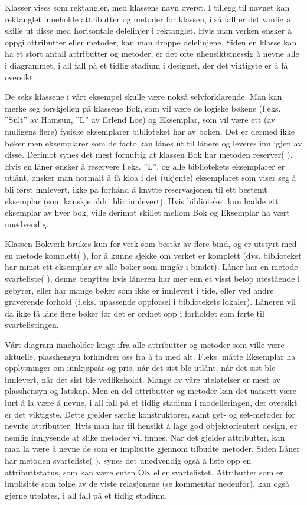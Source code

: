 Klasser vises som rektangler, med klassens navn øverst. I tillegg til navnet kan rektanglet inneholde attributter og metoder for klassen, i så fall er det vanlig å skille ut disse med horisontale delelinjer i rektanglet. Hvis man verken ønsker å oppgi attributter eller metoder, kan man droppe delelinjene. Siden en klasse kan ha et stort antall attributter og metoder, er det ofte uhensiktsmessig å nevne alle i diagrammet, i all fall på et tidlig stadium i designet, der det viktigste er å få oversikt.

De seks klassene i vårt eksempel skulle være nokså selvforklarende. Man kan merke seg forskjellen på klassene Bok, som vil være de logiske bøkene (f.eks. ”Sult” av Hamsun, ”L” av Erlend Loe) og Eksemplar, som vil være ett (av muligens flere) fysiske eksemplarer biblioteket har av boken. Det er dermed ikke bøker men eksemplarer som de facto kan lånes ut til lånere og leveres inn igjen av disse. Derimot synes det mest fornuftig at klassen Bok har metoden reserver( ). Hvis en låner ønsker å reservere f.eks. ”L”, og alle bibliotekets eksemplarer er utlånt, ønsker man normalt å få kloa i det (ukjente) eksemplaret som viser seg å bli først innlevert, ikke på forhånd å knytte reservasjonen til ett bestemt eksemplar (som kanskje aldri blir innlevert). Hvis biblioteket kun hadde ett eksemplar av hver bok, ville derimot skillet mellom Bok og Eksemplar ha vært unødvendig.

Klassen Bokverk brukes kun for verk som består av flere bind, og er utstyrt med en metode komplett( ), for å kunne sjekke om verket er komplett (dvs. biblioteket har minst ett eksemplar av alle bøker som inngår i bindet). Låner har en metode svarteliste( ), denne benyttes hvis låneren har mer enn et visst beløp utestående i gebyrer, eller har mange bøker som ikke er innlevert i tide, eller ved andre graverende forhold (f.eks. upassende oppførsel i bibliotekets lokaler). Låneren vil da ikke få låne flere bøker før det er ordnet opp i forholdet som førte til svartelistingen. 

Vårt diagram inneholder langt ifra alle attributter og metoder som ville være aktuelle, plasshensyn forhindrer oss fra å ta med alt. F.eks. måtte Eksemplar ha opplysninger om innkjøpsår og pris, når det sist ble utlånt, når det sist ble innlevert, når det sist ble vedlikeholdt. Mange av våre utelatelser er mest av plasshensyn og latskap. Men en del attributter og metoder kan det uansett være lurt å la være å nevne, i all fall på et tidlig stadium i modelleringen, der oversikt er det viktigste. Dette gjelder særlig konstruktorer, samt get- og set-metoder for nevnte attributter. Hvis man har til hensikt å lage god objektorientert design, er nemlig innlysende at slike metoder vil finnes. Når det gjelder attributter, kan man la være å nevne de som er implisitte gjennom tilbudte metoder. Siden Låner har metoden svarteliste( ), synes det unødvendig også å liste opp en attributtstatus, som kan være enten OK eller svartelistet. Attributter som er implisitte som følge av de viste relasjonene (se kommentar nedenfor), kan også gjerne utelates, i all fall på et tidlig stadium.

